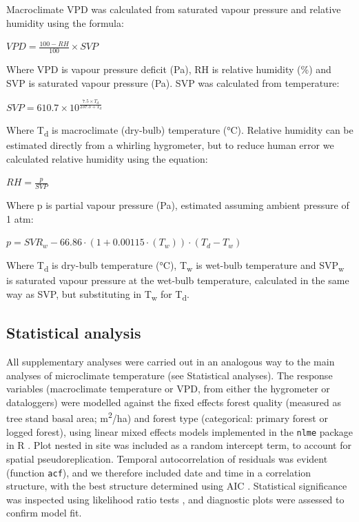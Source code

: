 \documentclass[12pt,a4paper,]{report}
\theoremstyle{definition}
\theoremstyle{definition}
\theoremstyle{definition}
\theoremstyle{remark}
\begin{document}
Macroclimate VPD was calculated from saturated vapour pressure and
relative humidity using the formula:

\begin{center}
$VPD = \frac{100 - RH}{100} \times SVP$
\end{center}

Where VPD is vapour pressure deficit (Pa), RH is relative humidity (\%)
and SVP is saturated vapour pressure (Pa). SVP was calculated from
temperature:

\begin{center}
$SVP = 610.7 \times 10^ \frac{7.5 \times T_d}{237.3 + T_d}$ 
\end{center}

Where T\textsubscript{d} is macroclimate (dry-bulb) temperature (°C).
Relative humidity can be estimated directly from a whirling hygrometer,
but to reduce human error we calculated relative humidity using the
equation:

\begin{center}
$RH = \frac{p}{SVP}$
\end{center}

Where p is partial vapour pressure (Pa), estimated assuming ambient
pressure of 1 atm:

\begin{center}
$p = SVR_w - 66.86 \cdot (1+0.00115 \cdot(T_w)) \cdot (T_d - T_w)$
\end{center}

Where T\textsubscript{d} is dry-bulb temperature (°C),
T\textsubscript{w} is wet-bulb temperature and SVP\textsubscript{w} is
saturated vapour pressure at the wet-bulb temperature, calculated in the
same way as SVP, but substituting in T\textsubscript{w} for
T\textsubscript{d}.

\subsection{Statistical analysis}\label{statistical-analysis-1}

All supplementary analyses were carried out in an analogous way to the
main analyses of microclimate temperature (see Statistical analyses).
The response variables (macroclimate temperature or VPD, from either the
hygrometer or dataloggers) were modelled against the fixed effects
forest quality (measured as tree stand basal area;
m\textsuperscript{2}/ha) and forest type (categorical: primary forest or
logged forest), using linear mixed effects models implemented in the
\texttt{nlme} package \citep{pinheiro_nlme:_2017} in R
\citep{r_core_team_2017}. Plot nested in site was included as a random
intercept term, to account for spatial pseudoreplication. Temporal
autocorrelation of residuals was evident (function \texttt{acf}), and we
therefore included date and time in a correlation structure, with the
best structure determined using AIC \citep{zuur_mixed_2009}. Statistical
significance was inspected using likelihood ratio tests \citep[see
Materials and Methods;][]{zuur_mixed_2009}, and diagnostic plots were
assessed to confirm model fit.
\end{document}

